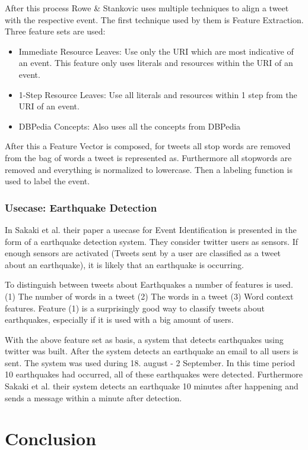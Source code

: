 \documentclass{article}
\begin{document}
After this process  Rowe \& Stankovic \cite{eventalign} uses multiple techniques to align a tweet with the respective event. The first technique used by them is Feature Extraction. \cite{eventalign} Three feature sets are used:
\begin{itemize}

  \item Immediate Resource Leaves: Use only the URI which are most indicative of an event. This feature only uses literals and resources within the URI of an event. 
  \item 1-Step Resource Leaves: Use all literals and resources within 1 step from the URI of an event. 
  \item DBPedia Concepts: Also uses all the concepts from DBPedia 
\end{itemize}
After this a Feature Vector is composed, for tweets all stop words are removed from the bag of words a tweet is represented as. Furthermore all stopwords are removed and everything is normalized to lowercase. \cite{eventalign} Then a labeling function is used to label the event. 
\subsubsection{Usecase: Earthquake Detection}
In Sakaki et al. their paper a usecase for Event Identification is presented in the form of a earthquake detection system. \cite{earthq} They consider twitter users as sensors. If enough sensors are activated (Tweets sent by a user are classified as a tweet about an earthquake), it is likely that an earthquake is occurring. 

To distinguish between tweets about Earthquakes a number of features is used. (1) The number of words in a tweet (2) The words in a tweet (3) Word context features. Feature (1) is a surprisingly good way to classify tweets about earthquakes, especially if it is used with a big amount of users. 

With the above feature set as basis, a system that detects earthquakes using twitter was built. After the system detects an earthquake an email to all users is sent. The system was used during 18. august - 2 September. In this time period 10 earthquakes had occurred, all of these earthquakes were detected. Furthermore Sakaki et al. their system detects an earthquake 10 minutes after happening and sends a message within a minute after detection. 
\cite{earthq}
\newpage

\section{Conclusion}

\newpage



\end{document}
